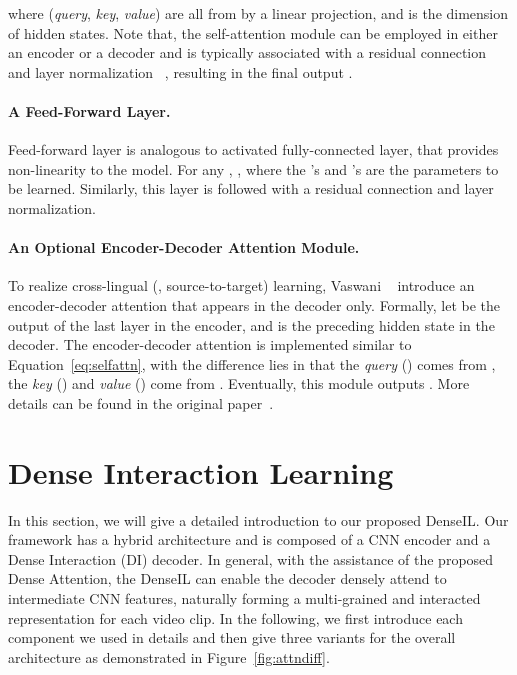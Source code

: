 \documentclass[10pt,twocolumn,letterpaper]{article}
\begin{document}
where  (\textit{query}, \textit{key}, \textit{value}) are all from  by a linear projection, and  is the dimension of hidden states. Note that, the self-attention module can be employed in either an encoder or a decoder and is typically associated with a residual connection and layer normalization ~\cite{ba2016layer}, resulting in the final output .

\vspace{-2mm}
\paragraph{A Feed-Forward Layer.}
Feed-forward layer is analogous to activated fully-connected layer, that provides non-linearity to the model. For any , , where the 's and 's are the parameters to be learned. Similarly, this layer is followed with a residual connection and layer normalization.

\vspace{-2mm}
\paragraph{An Optional Encoder-Decoder Attention Module.}
To realize cross-lingual (\ie, source-to-target) learning, Vaswani \etal~\cite{vaswani2017attention} introduce an encoder-decoder attention that appears in the decoder only. Formally, let  be the output of the last layer in the encoder, and  is the preceding hidden state in the decoder. The encoder-decoder attention is implemented similar to Equation~\eqref{eq:selfattn}, with the difference lies in that the \textit{query} () comes from , the \textit{key} () and \textit{value} () come from . Eventually, this module outputs . More details can be found in the original paper~\cite{vaswani2017attention}.

\section{Dense Interaction Learning}
\label{sec:method}
In this section, we will give a detailed introduction to our proposed DenseIL. Our framework has a hybrid architecture and is composed of a CNN encoder and a Dense Interaction (DI) decoder. In general, with the assistance of the proposed Dense Attention, the DenseIL can enable the decoder densely attend to intermediate CNN features, naturally forming a multi-grained and interacted representation for each video clip. In the following, we first introduce each component we used in details and then give three variants for the overall architecture as demonstrated in Figure~\ref{fig:attndiff}.
\end{document}
